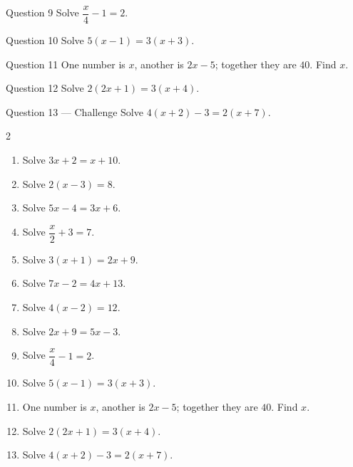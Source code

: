 \documentclass[11pt]{article}
\begin{document}
\begin{qbox}{Question 9}
Solve $\dfrac{x}{4}-1=2$.\workspace{2.0cm}
\end{qbox}

\begin{qbox}{Question 10}
Solve $5(x-1)=3(x+3)$.\workspace{2.4cm}
\end{qbox}

\begin{qbox}{Question 11}
One number is $x$, another is $2x-5$; together they are $40$. Find $x$.\workspace{2.4cm}
\end{qbox}

\begin{qbox}{Question 12}
Solve $2(2x+1)=3(x+4)$.\workspace{2.4cm}
\end{qbox}

\begin{qbox}{Question 13 --- Challenge}
Solve $4(x+2)-3=2(x+7)$.\workspace{2.6cm}
\end{qbox}

\clearpage
{}

\begin{recapbox}
\begin{multicols}{2}
\small
\begin{enumerate}[leftmargin=*,itemsep=3pt]
  \item Solve $3x+2=x+10$.
  \item Solve $2(x-3)=8$.
  \item Solve $5x-4=3x+6$.
  \item Solve $\dfrac{x}{2}+3=7$.
  \item Solve $3(x+1)=2x+9$.
  \item Solve $7x-2=4x+13$.
  \item Solve $4(x-2)=12$.
  \item Solve $2x+9=5x-3$.
  \item Solve $\dfrac{x}{4}-1=2$.
  \item Solve $5(x-1)=3(x+3)$.
  \item One number is $x$, another is $2x-5$; together they are $40$. Find $x$.
  \item Solve $2(2x+1)=3(x+4)$.
  \item Solve $4(x+2)-3=2(x+7)$.
\end{enumerate}
\end{multicols}
\end{recapbox}
\end{document}
